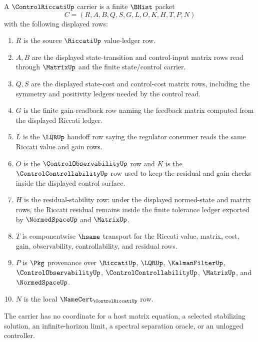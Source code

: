 \begin{definition}
\label{def:control-riccati-carrier}
A $\ControlRiccatiUp$ carrier is a finite $\BHist$ packet
$$
C=(R,A,B,Q,S,G,L,O,K,H,T,P,N)
$$
with the following displayed rows:
\begin{enumerate}
\item $R$ is the source $\RiccatiUp$ value-ledger row.
\item $A,B$ are the displayed state-transition and control-input matrix rows read through $\MatrixUp$ and the finite state/control carrier.
\item $Q,S$ are the displayed state-cost and control-cost matrix rows, including the symmetry and positivity ledgers needed by the control read.
\item $G$ is the finite gain-readback row naming the feedback matrix computed from the displayed Riccati ledger.
\item $L$ is the $\LQRUp$ handoff row saying the regulator consumer reads the same Riccati value and gain rows.
\item $O$ is the $\ControlObservabilityUp$ row and $K$ is the $\ControlControllabilityUp$ row used to keep the residual and gain checks inside the displayed control surface.
\item $H$ is the residual-stability row: under the displayed normed-state and matrix rows, the Riccati residual remains inside the finite tolerance ledger exported by $\NormedSpaceUp$ and $\MatrixUp$.
\item $T$ is componentwise $\hsame$ transport for the Riccati value, matrix, cost, gain, observability, controllability, and residual rows.
\item $P$ is $\Pkg$ provenance over $\RiccatiUp$, $\LQRUp$, $\KalmanFilterUp$, $\ControlObservabilityUp$, $\ControlControllabilityUp$, $\MatrixUp$, and $\NormedSpaceUp$.
\item $N$ is the local $\NameCert_{\ControlRiccatiUp}$ row.
\end{enumerate}
The carrier has no coordinate for a host matrix equation, a selected stabilizing solution, an infinite-horizon limit, a spectral separation oracle, or an unlogged controller.
\end{definition}

